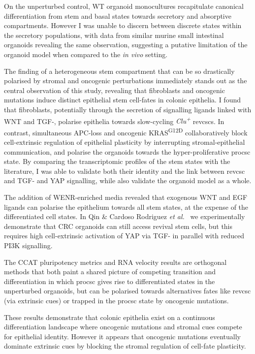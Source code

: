 On the unperturbed control, WT organoid monocultures recapitulate canonical differentiation from stem and basal states towards secretory and absorptive compartments. However I was unable to discern between discrete states within the secretory populations, with data from similar murine small intestinal organoids revealing the same observation, suggesting a putative limitation of the organoid model when compared to the \emph{in vivo} setting.

The finding of a heterogeneous stem compartment that can be so drastically polarised by stromal and oncogenic perturbations immediately stands out as the central observation of this study, revealing that fibroblasts and oncogenic mutations induce distinct epithelial stem cell-fates in colonic epithelia. I found that fibroblasts, potentially through the secretion of signalling ligands linked with WNT and TGF-, polarise epithelia towards slow-cycling \textit{Clu\textsuperscript{+}} \acrshort{revcsc}s. In contrast, simultaneous APC-loss and oncogenic KRAS\textsuperscript{G12D} collaboratively block cell-extrinsic regulation of epithelial plasticity by interrupting stromal-epithelial communication, and polarise the organoids towards the hyper-proliferative \acrshort{procsc} state. By comparing the transcriptomic profiles of the stem states with the literature, I was able to validate both their identity and the link between \acrshort{revcsc} and TGF- and YAP signalling, while also validate the organoid model as a whole.

The addition of WENR-enriched media revealed that exogenous WNT and EGF ligands can polarise the epithelium towards all stem states, at the expense of the differentiated cell states. In Qin \& Cardoso Rodriguez \emph{et al.}~\cite{cardoso_rodriguez_single-cell_2023} we experimentally demonstrate that CRC organoids can still access revival stem cells, but this requires high cell-extrinsic activation of YAP via TGF- in parallel with reduced PI3K signalling. 

The CCAT pluripotency metrics and RNA velocity results are orthogonal methods that both paint a shared picture of competing transition and differentiation in which \acrshort{procsc} gives rise to differentiated states in the unperturbed organoids, but can be polarised towards alternatives fates like \acrshort{revcsc} (via extrinsic cues) or trapped in the \acrshort{procsc} state by oncogenic mutations.

These results demonstrate that colonic epithelia exist on a continuous differentiation landscape where oncogenic mutations and stromal cues compete for epithelial identity. However it appears that oncogenic mutations eventually dominate extrinsic cues by blocking the stromal regulation of cell-fate plasticity. 
